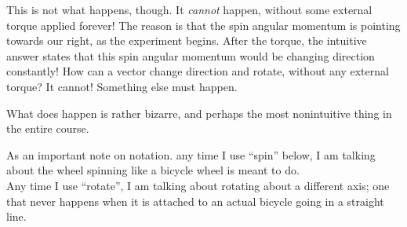 This is not what happens, though. It \emph{cannot} happen, without some external torque applied forever! The reason is that the spin angular momentum is pointing towards our right, as the experiment begins. After the torque, the intuitive answer states that this spin angular momentum would be changing direction constantly! How can a vector change direction and rotate, without any external torque? It cannot! Something else must happen.

What does happen is rather bizarre, and perhaps the most nonintuitive thing in the entire course.

As an important note on notation. any time I use ``spin'' below, I am talking about the wheel spinning like a bicycle wheel is meant to do.\\
Any time I use ``rotate'', I am talking about rotating about a different axis; one that never happens when it is attached to an actual bicycle going in a straight line.

